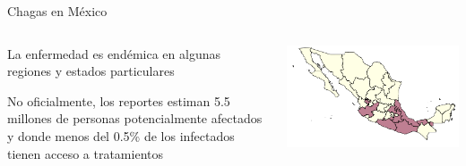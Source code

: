 \documentclass{beamer}
\begin{document}
\begin{frame}{Chagas en México}
	\begin{columns}
		\begin{column}{0.3\textwidth}

			La enfermedad es endémica en algunas regiones y estados particulares


			\medskip No oficialmente, los reportes estiman 5.5 millones de personas potencialmente afectados y donde menos del 0.5\% de los infectados tienen acceso a tratamientos


		\end{column}
		\begin{column}{0.7\textwidth}
			\includegraphics[width=\textwidth]{slides/Ambientes_Gran_Chaco-Mexico_original.png}
		\end{column}
	\end{columns}
\end{frame}
\end{document}
